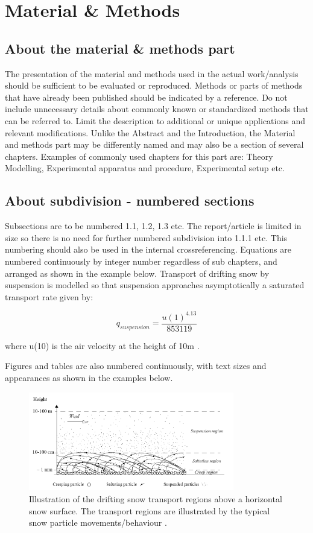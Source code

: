 \documentclass[a4paper,12pt]{extarticle}
\begin{document}
\section{Material \& Methods}
\subsection{About the material \& methods part}
The presentation of the material and methods used in the actual work/analysis should be sufficient to be evaluated or reproduced. Methods or parts of methods that have already been published should be indicated by a reference. Do not include unnecessary details about commonly known or standardized methods that can be referred to. Limit the description to additional or unique applications and relevant modifications. Unlike the Abstract and the Introduction, the Material and methods part may be differently named and may also be a section of several chapters. Examples of commonly used chapters for this part are: Theory Modelling, Experimental apparatus and procedure, Experimental setup etc.

\subsection{About subdivision - numbered sections}
Subsections are to be numbered 1.1, 1.2, 1.3 etc. The report/article is limited in size so there is no need for further numbered subdivision into 1.1.1 etc. This numbering should also be used in the internal crossreferencing. Equations are numbered continuously by integer number regardless of sub chapters, and arranged as shown in the example below. Transport of drifting snow by suspension is modelled so that suspension approaches asymptotically a saturated transport rate given by:

\begin{equation}
  q_{suspension} = \frac{u(1)^{4.13}}{853119}
  \label{eq:FirstEquation}
\end{equation}

where u(10) is the air velocity at the height of 10m \citep{Tabler1990}.

Figures and tables are also numbered continuously, with text sizes and appearances as shown in the examples below. 

\begin{figure}[H]
  \centering
  \includegraphics[width=0.8\textwidth]{SnowTransport.png}
  \caption{Illustration of the drifting snow transport regions above a horizontal snow surface. The transport regions are illustrated by the typical snow particle movements/behaviour \citep{Sundsbo1997}.}
  \label{fig:SnowTransport}
\end{figure}
\end{document}
